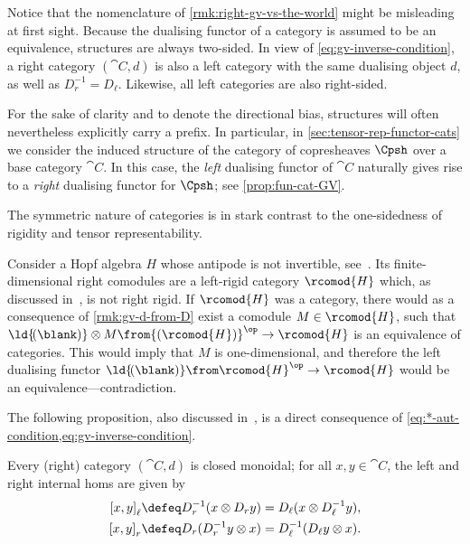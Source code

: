 \begin{remark}\label{rmk:GV-is-symmetric}
  Notice that the nomenclature of \cref{rmk:right-gv-vs-the-world} might be misleading at first sight.
  Because the dualising functor of a \GV{} category is assumed to be an equivalence,
  \GV{} structures are always two-sided.
  In view of \cref{eq:gv-inverse-condition},
  a right \GV{} category \((\cat{C}, d)\)
  is also a left \GV{} category
  with the same dualising object \(d\), as well as \(D_r^{-1} = D_{\ell}\).
  Likewise, all left \GV{} categories are also right-sided.

  For the sake of clarity and to denote the directional bias,
  \GV{} structures will often nevertheless explicitly carry a prefix.
  In particular, in \cref{sec:tensor-rep-functor-cats}
  we consider the induced \GV{} structure of the category of copresheaves \(\Cpsh\) over a \GV{} base category \(\cat{C}\).
  In this case, the \emph{left} dualising functor of \(\cat{C}\) naturally gives rise to a \emph{right} dualising functor for \(\Cpsh\);
  see \cref{prop:fun-cat-GV}.
\end{remark}

The symmetric nature of \GV{} categories is in stark contrast to
the one\hyp{}sidedness of rigidity and tensor representability.

\begin{example}\label{ex:right-rigid-not-gv}
  Consider a Hopf algebra \(H\) whose antipode is not invertible,
  see~\cite{schauenburg2000:FaithfulFlatnessHopf}.
  Its finite\hyp{}dimensional right comodules are a left-rigid category \(\rcomod{H}\) which,
  as discussed in~\cite[Remark~2]{ulbrich1990:HopfAlgebrasRigid}, is not right rigid.
  If \(\rcomod{H}\) was a \GV{} category, there would
  as a consequence of \cref{rmk:gv-d-from-D}
  exist a comodule \(M \in \rcomod{H}\),
  such that \(\ld{\!(\blank)}\otimes M \from {(\rcomod{H})}^{\op}\to \rcomod{H}\) is an equivalence of categories.
  This would imply that \(M\) is one-dimensional,
  and therefore the left dualising functor \(\ld{\!(\blank)}\from \rcomod{H}^{\op}\to \rcomod{H}\) would be an equivalence—contradiction.
\end{example}

The following proposition, also discussed in~\cite[Section~2]{boyarchenko13:groth-verdier},
is a direct consequence of \cref{eq:*-aut-condition,eq:gv-inverse-condition}.

\begin{proposition}\label{prop:gv->closed}
  Every (right) \GV{} category \((\cat{C}, d)\) is closed mon\-oidal;
  for all \(x, y \in \cat{C}\), the left and right internal homs are given by
  \begin{equation}\label{eq:gv->internal hom}
    \begin{aligned}
      {[x, y]}_{\ell} &\defeq D_r^{-1}(x \otimes D_r y) = D_{\ell}(x \otimes D_{\ell}^{-1} y), \\
      {[x, y]}_r &\defeq D_r(D_r^{-1}y \otimes x) = D_{\ell}^{-1}(D_{\ell}y \otimes x).
    \end{aligned}
  \end{equation}
\end{proposition}


